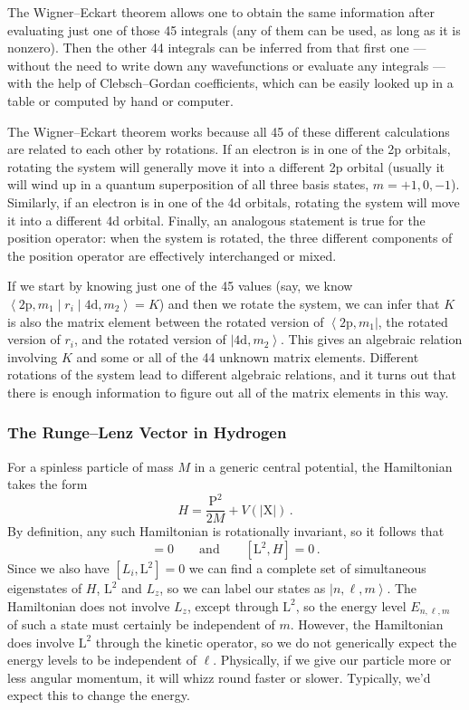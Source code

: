\documentclass{article}
\theoremstyle{plain}\theoremheaderfont{\normalfont\itshape}\theorembodyfont{\rmfamily}\theoremseparator{.}\newtheorem*{rem}{Remark}\newtheorem*{ex}{Example}\newtheorem*{proof}{Proof}\newtheorem*{altp}{Alternative proof}
\theoremstyle{plain}\theoremheaderfont{\normalfont\bfseries}\theorembodyfont{\rmfamily}\theoremseparator{.}\newtheorem{thm}{Theorem}[section]\newtheorem{lem}[thm]{Lemma}\newtheorem{prop}[thm]{Proposition}\newtheorem*{cor}{Corollary}\newtheorem{defn}[thm]{Definition}\newtheorem{clm}[thm]{Claim}\newtheorem{clminproof}{Claim}
\theoremstyle{break}\theoremheaderfont{\normalfont\itshape}\theorembodyfont{\rmfamily}\theoremseparator{.\medskip}\newtheorem*{proofskip}{Proof}\newtheorem*{exs}{Examples}\newtheorem*{rems}{Remarks}
\theoremstyle{break}\theoremheaderfont{\normalfont\bfseries}\theorembodyfont{\rmfamily}\theoremseparator{.\medskip}\newtheorem{lemskip}[thm]{Lemma}\newtheorem{defnskip}[thm]{Definition}\newtheorem{propskip}[thm]{Proposition}\newtheorem{thmskip}[thm]{Theorem}
\numberwithin{equation}{section}
\newcommand{\bra}[1]{\left\langle #1 \right|}
\newcommand{\ket}[1]{\left| #1 \right\rangle}
\newcommand{\mel}[3]{\left\langle #1 \middle| #2 \middle| #3 \right\rangle}
\newcommand{\vb}[1]{\bm{\mathrm{#1}}}
\newcommand{\abs}[1]{\left| #1 \right|}
\begin{document}
    The Wigner--Eckart theorem allows one to obtain the same information after evaluating just one of those 45 integrals (any of them can be used, as long as it is nonzero). Then the other 44 integrals can be inferred from that first one --- without the need to write down any wavefunctions or evaluate any integrals --- with the help of Clebsch--Gordan coefficients, which can be easily looked up in a table or computed by hand or computer.

    The Wigner--Eckart theorem works because all 45 of these different calculations are related to each other by rotations. If an electron is in one of the 2p orbitals, rotating the system will generally move it into a different 2p orbital (usually it will wind up in a quantum superposition of all three basis states, \(m=+1,0,-1\)). Similarly, if an electron is in one of the 4d orbitals, rotating the system will move it into a different 4d orbital. Finally, an analogous statement is true for the position operator: when the system is rotated, the three different components of the position operator are effectively interchanged or mixed.

    If we start by knowing just one of the 45 values (say, we know \(\mel{\mathrm{2p},m_1}{r_{i}}{\mathrm{4d},m_2} =K\)) and then we rotate the system, we can infer that \(K\) is also the matrix element between the rotated version of \(\bra{\mathrm{2p},m_1}\), the rotated version of \(r_i\), and the rotated version of \(\ket{\mathrm{4d},m_2}\). This gives an algebraic relation involving \(K\) and some or all of the 44 unknown matrix elements. Different rotations of the system lead to different algebraic relations, and it turns out that there is enough information to figure out all of the matrix elements in this way.

    \subsubsection{The Runge--Lenz Vector in Hydrogen}
    For a spinless particle of mass \(M\) in a generic central potential, the Hamiltonian takes the form
    \begin{equation}
        H=\frac{\vb{P}^2}{2M}+V(\abs{\vb{X}})\,.
    \end{equation}
    By definition, any such Hamiltonian is rotationally invariant, so it follows that
    \begin{equation}
        [\vb{L},H]=0\qquad\text{and}\qquad[\vb{L}^2,H]=0\,.
    \end{equation}
    Since we also have \([L_i,\vb{L}^2]=0\) we can find a complete set of simultaneous eigenstates of \(H\), \(\vb{L}^2\) and \(L_z\), so we can label our states as \(\ket{n,\ell,m}\). The Hamiltonian does not involve \(L_z\), except through \(\vb{L}^2\), so the energy level \(E_{n,\ell,m}\) of such a state must certainly be independent of \(m\). However, the Hamiltonian does involve \(\vb{L}^2\) through the kinetic operator, so we do not generically expect the energy levels to be independent of \(\ell\). Physically, if we give our particle more or less angular momentum, it will whizz round faster or slower. Typically, we'd expect this to change the energy.
\end{document}
